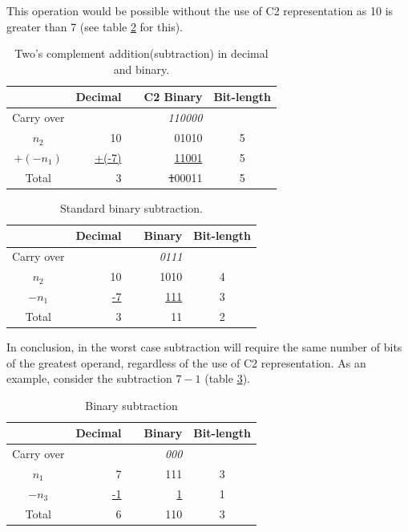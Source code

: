 \documentclass[12pt]{article}
\begin{document}
This operation would be possible without the use of C2 representation as 10 is
greater than 7 (see table \ref{tab:04} for this).

\begin{table}[ht]
	\centering
    \caption{Two's complement addition(subtraction) in decimal and binary.}
    \begin{tabular}{crrrc}
    \hline
    	  & Decimal & & C2 Binary & Bit-length \\
    \hline      
    Carry over & 	& & \textit{110000} & \\
    $n_2$ & 10	& & 01010 & 5 \\
    $+(-n_1)$ & \underline{+(-7)} & & \underline{11001} & 5 \\
    Total & 3	& & \sout{1}00011 & 5 \\
    \hline
	\end{tabular}
    \label{tab:03}
\end{table}

\begin{table}[ht]
	\centering
    \caption{Standard binary subtraction.}
    \begin{tabular}{crrrc}
    \hline
    	  & Decimal & & Binary & Bit-length \\
    \hline      
    Carry over& 	& & \textit{0111} & \\
    $n_2$ & 10	& & 1010 & 4 \\
    $-n_1$ & \underline{-7} & & \underline{111} & 3 \\
    Total & 3	& & 11 & 2\\
    \hline
	\end{tabular}
    \label{tab:04}
\end{table}

In conclusion, in the worst case subtraction will require the same number of
bits of the greatest operand, regardless of the use of C2 representation. As an
example, consider the subtraction $7-1$ (table \ref{tab:05}).

\begin{table}[ht]
	\centering
    \caption{Binary subtraction}
    \begin{tabular}{crrrc}
    \hline
    	  & Decimal & & Binary & Bit-length \\
    \hline      
    Carry over & 	& & \textit{000} & \\
    $n_1$ & 7	& & 111 & 3 \\
    $-n_3$ & \underline{-1} & & \underline{1} & 1 \\
    Total & 6	& & 110 & 3\\
    \hline
	\end{tabular}
    \label{tab:05}
\end{table}
\end{document}
